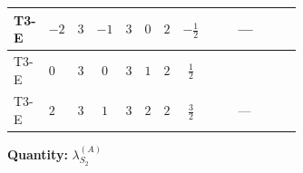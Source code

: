 \documentclass[8pt]{article}
\begin{document}
\begin{landscape}
\begin{longtable}{@{}llcccccc >{\raggedright\arraybackslash}p{0.21\linewidth} >{\raggedright\arraybackslash}p{0.21\linewidth} >{\raggedright\arraybackslash}p{0.21\linewidth}@{}}
\midrule
T3-E & $-2$ & $3$ & $-1$ & $3$ & $0$ & $2$ & $-\frac{1}{2}$ & \scriptsize\adjustbox{max width=\linewidth}{$\begin{gathered} +\frac{3 {g_2}^4}{4}\end{gathered}$} & --- & \scriptsize\adjustbox{max width=\linewidth}{$\begin{gathered} +{g_2}^2 (-3 {\lambda_{S_2}^{(1)}}-24 {\lambda_{S_2}^{(A)}})\end{gathered}$} \\
\midrule
T3-E & $0$ & $3$ & $0$ & $3$ & $1$ & $2$ & $\frac{1}{2}$ & \scriptsize\adjustbox{max width=\linewidth}{$\begin{gathered} +\frac{3 {g_2}^4}{4}\end{gathered}$} & \scriptsize\adjustbox{max width=\linewidth}{$\begin{gathered} +{g_1}^2 \left(9 {g_2}^2-\frac{3 {\lambda_{S_2}^{(1)}}}{2}-12 {\lambda_{S_2}^{(A)}}\right)\end{gathered}$} & \scriptsize\adjustbox{max width=\linewidth}{$\begin{gathered} +{g_2}^2 (-3 {\lambda_{S_2}^{(1)}}-24 {\lambda_{S_2}^{(A)}})\end{gathered}$} \\
\midrule
T3-E & $2$ & $3$ & $1$ & $3$ & $2$ & $2$ & $\frac{3}{2}$ & \scriptsize\adjustbox{max width=\linewidth}{$\begin{gathered} +\frac{3 {g_2}^4}{4}\end{gathered}$} & --- & \scriptsize\adjustbox{max width=\linewidth}{$\begin{gathered} +{g_2}^2 (-3 {\lambda_{S_2}^{(1)}}-24 {\lambda_{S_2}^{(A)}})\end{gathered}$} \\
\midrule
\bottomrule
\end{longtable}
\clearpage
\noindent\textbf{Quantity: }$\lambda_{S_2}^{(A)}$\par\smallskip

\end{landscape}
\end{document}
